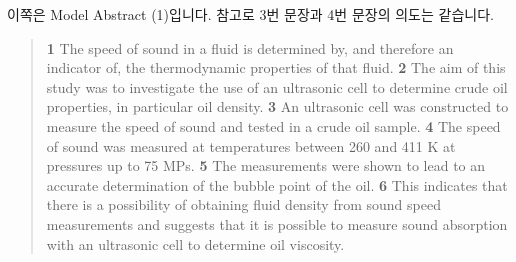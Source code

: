 \documentclass[10pt]{report}
\begin{document}
	\newpage
	이쪽은 Model Abstract (1)입니다. 참고로 3번 문장과 4번 문장의 의도는 같습니다.
	\begin{quote}
		{\bf 1} The speed of sound in a fluid is determined by, and therefore an indicator of, the thermodynamic properties of that fluid. {\bf 2} The aim of this study was to investigate the use of an ultrasonic cell to determine crude oil properties, in particular oil density. {\bf 3} An ultrasonic cell was constructed to measure the speed of sound and tested in a crude oil sample. {\bf 4} The speed of sound was measured at temperatures between 260 and 411 K at pressures up to 75 MPs. {\bf 5} The measurements were shown to lead to an accurate determination of the bubble point of the oil. {\bf 6} This indicates that there is a possibility of obtaining fluid density from sound speed measurements and suggests that it is possible to measure sound absorption with an ultrasonic cell to determine oil viscosity.
	\end{quote}
\end{document}
